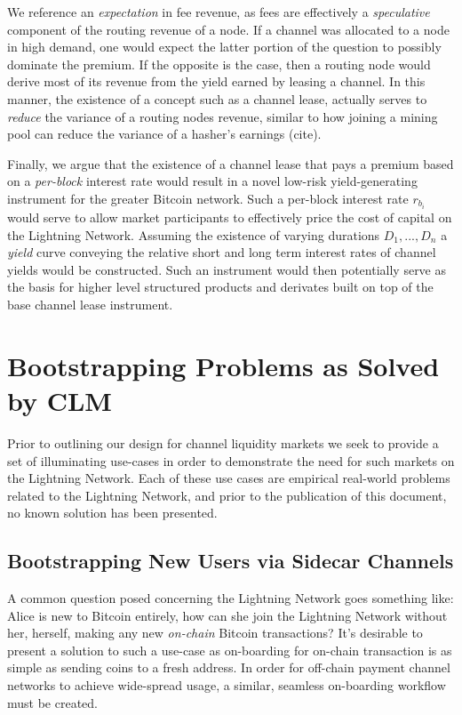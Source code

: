 \documentclass[12pt,a4paper]{article}
\theoremstyle{definition}
\begin{document}
We reference an \emph{expectation} in fee revenue, as fees are effectively a
\emph{speculative} component of the routing revenue of a node. If a channel was
allocated to a node in high demand, one would expect the latter portion of the
question to possibly dominate the premium. If the opposite is the case, then a
routing node would derive most of its revenue from the yield earned by leasing
a channel. In this manner, the existence of a concept such as a channel lease,
actually serves to \emph{reduce} the variance of a routing nodes revenue,
similar to how joining a mining pool can reduce the variance of a hasher's
earnings (cite).

Finally, we argue that the existence of a channel lease that pays a premium
based on a \emph{per-block} interest rate would result in a novel low-risk
yield-generating instrument for the greater Bitcoin network. Such a per-block
interest rate $r_{b_i}$ would serve to allow market participants to effectively
price the cost of capital on the Lightning Network. Assuming the existence of
varying durations ${D_1, ..., D_n}$ a \emph{yield} curve conveying the relative
short and long term interest rates of channel yields would be constructed. Such
an instrument would then potentially serve as the basis for higher level
structured products and derivates built on top of the base channel lease
instrument.


\section{Bootstrapping Problems as Solved by CLM}

Prior to outlining our design for channel liquidity markets we seek to provide
a set of illuminating use-cases in order to demonstrate the need for such
markets on the Lightning Network. Each of these use cases are empirical
real-world problems related to the Lightning Network, and prior to the
publication of this document, no known solution has been presented.

\subsection{Bootstrapping New Users via Sidecar Channels}

A common question posed concerning the Lightning Network goes something like:
Alice is new to Bitcoin entirely, how can she join the Lightning Network
without her, herself, making any new \emph{on-chain} Bitcoin transactions? It's
desirable to present a solution to such a use-case as on-boarding for on-chain
transaction is as simple as sending coins to a fresh address. In order for
off-chain payment channel networks to achieve wide-spread usage, a similar,
seamless on-boarding workflow must be created.
\end{document}
